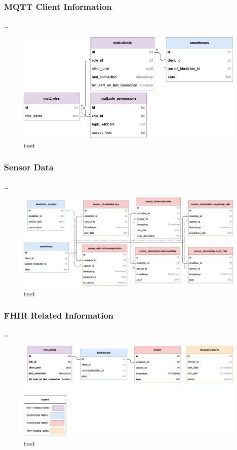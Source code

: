 \subsubsection{MQTT Client Information}
\dots 

\begin{figure}[H]
    \centering
    \includegraphics[width=\linewidth]{images/wow-dbschema-mqtt.png}
    \caption[test]{test}
    \label{fig:wow-dbschema-mqtt}
\end{figure}

\subsubsection{Sensor Data}
\dots 

\begin{figure}[H]
    \centering
    \includegraphics[width=\linewidth]{images/wow-dbschema-sensors.png}
    \caption[test]{test}
    \label{fig:wow-dbschema-sensors}
\end{figure}

\subsubsection{FHIR Related Information}
\dots 

\begin{figure}[H]
    \centering
    \includegraphics[width=\linewidth]{images/wow-dbschema-fhir.png}
    \caption[test]{test}
    \label{fig:wow-dbschema-fhir}
\end{figure}

